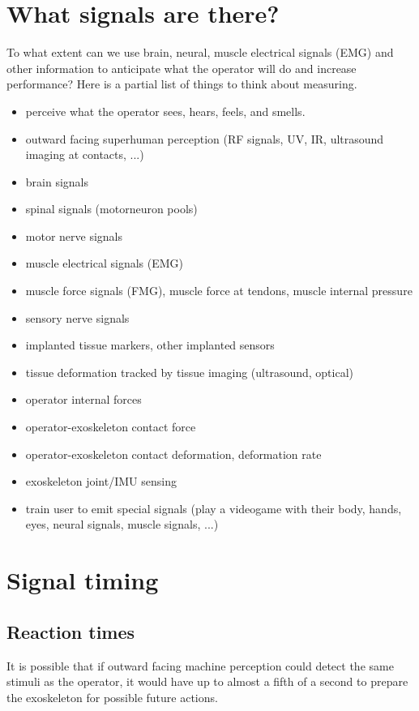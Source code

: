 \documentclass[letterpaper,12pt,fullpage]{article}
\begin{document}
\section{What signals are there?}

To what extent can we use brain, neural, muscle electrical signals
(EMG) and other information
to anticipate what the operator will do and increase performance?
Here is a partial list of things to think about measuring.

\begin{itemize}
\item
perceive what the operator sees, hears, feels, and smells.
\item
outward facing superhuman perception (RF signals, UV, IR, ultrasound
imaging at contacts, ...)
\item
brain signals
\item
spinal signals (motorneuron pools)
\item
motor nerve signals
\item
muscle electrical signals (EMG)
\item
muscle force signals (FMG), muscle force at tendons, muscle internal pressure
\item
sensory nerve signals
\item
implanted tissue markers, other implanted sensors
\item
tissue deformation tracked by tissue imaging (ultrasound, optical)
\item
operator internal forces
\item
operator-exoskeleton contact force
\item
operator-exoskeleton contact deformation, deformation rate
\item
exoskeleton joint/IMU sensing
\item
train user to emit special signals (play a videogame with their body,
hands, eyes, neural signals, muscle signals, ...)
\end{itemize}

\section{Signal timing}

\subsection{Reaction times}

It is possible that if outward facing machine perception could
detect the same stimuli as the operator,
it would have up to almost a fifth of a second
to prepare the exoskeleton for possible future actions.
\end{document}
